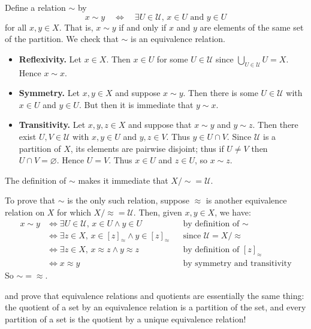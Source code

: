 \begin{cproof}
Define a relation $\sim$ by
\[ x \sim y \quad \Leftrightarrow \quad \exists U \in \mathcal{U},\, x \in U \text{ and } y \in U \]
for all $x,y \in X$. That is, $x \sim y$ if and only if $x$ and $y$ are elements of the same set of the partition. We check that $\sim$ is an equivalence relation.
\begin{itemize}
\item \textbf{Reflexivity.} Let $x \in X$. Then $x \in U$ for some $U \in \mathcal{U}$ since $\bigcup_{U \in \mathcal{U}} U = X$. Hence $x \sim x$.
\item \textbf{Symmetry.} Let $x,y \in X$ and suppose $x \sim y$. Then there is some $U \in \mathcal{U}$ with $x \in U$ and $y \in U$. But then it is immediate that $y \sim x$.
\item \textbf{Transitivity.} Let $x,y,z \in X$ and suppose that $x \sim y$ and $y \sim z$. Then there exist $U,V \in \mathcal{U}$ with $x,y \in U$ and $y,z \in V$. Thus $y \in U \cap V$. Since $\mathcal{U}$ is a partition of $X$, its elements are pairwise disjoint; thus if $U \ne V$ then $U \cap V = \varnothing$. Hence $U=V$. Thus $x \in U$ and $z \in U$, so $x \sim z$.
\end{itemize}
The definition of $\sim$ makes it immediate that $X/{\sim} = \mathcal{U}$.

To prove that $\sim$ is the only such relation, suppose $\approx$ is another equivalence relation on $X$ for which $X/{\approx}=\mathcal{U}$. Then, given $x,y \in X$, we have:
\begin{align*}
x \sim y & \Leftrightarrow \exists U \in \mathcal{U},\, x \in U \wedge y \in U && \text{by definition of $\sim$} \\
& \Leftrightarrow \exists z \in X,\, x \in [z]_{\approx} \wedge y \in [z]_{\approx} && \text{since $\mathcal{U} = X/{\approx}$} \\
& \Leftrightarrow \exists z \in X,\, x \approx z \wedge y \approx z && \text{by definition of $[z]_{\approx}$} \\
& \Leftrightarrow x \approx y && \text{by symmetry and transitivity}
\end{align*}
So ${\sim} = {\approx}$.
\end{cproof}

 and  prove that equivalence relations and quotients are essentially the same thing: the quotient of a set by an equivalence relation is a partition of the set, and every partition of a set is the quotient by a unique equivalence relation!

